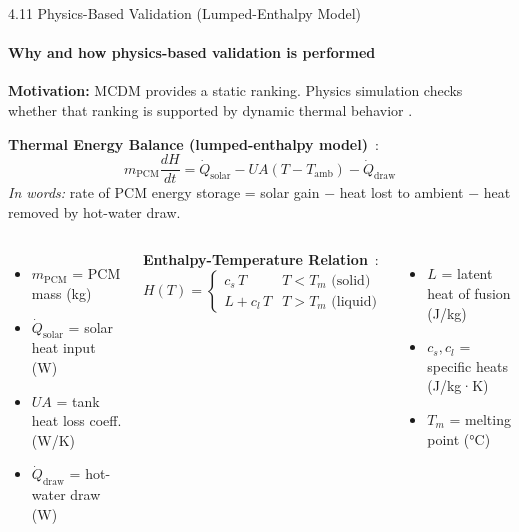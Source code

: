 \documentclass[aspectratio=169, 11pt]{beamer}
\begin{document}
\begin{frame}{4.11 Physics-Based Validation (Lumped-Enthalpy Model)}
\framesubtitle{Why and how physics-based validation is performed}

\footnotesize
\textbf{Motivation:} MCDM provides a static ranking. Physics simulation
checks whether that ranking is supported by dynamic thermal behavior \cite{Barqawi2025PCMSim, Abdellatif2025PCM_Modeling}.

\vspace{0.15cm}
\textbf{Thermal Energy Balance (lumped-enthalpy model)}~\cite{Barqawi2025PCMSim, MADADIAVARGANI2021101350}:
\[
m_{\mathrm{PCM}}\frac{dH}{dt} = \dot{Q}_{\mathrm{solar}} - UA(T-T_{\mathrm{amb}}) - \dot{Q}_{\mathrm{draw}}
\]
\textit{In words:} rate of PCM energy storage = solar gain
$-$ heat lost to ambient $-$ heat removed by hot-water draw.

\vspace{0.1cm}
\begin{columns}[T]
    \footnotesize
    \begin{itemize}
        \setlength{\itemsep}{0pt}
        \item $m_{\mathrm{PCM}}$ = PCM mass (kg)
        \item $\dot{Q}_{\mathrm{solar}}$ = solar heat input (W)
        \item $UA$ = tank heat loss coeff. (W/K)
        \item $\dot{Q}_{\mathrm{draw}}$ = hot-water draw (W)
    \end{itemize}

    \small
    \textbf{Enthalpy-Temperature Relation}~\cite{Abdellatif2025PCM_Modeling}:
    \footnotesize
    \[
    H(T) = \begin{cases}
    c_{s}\,T & T < T_{m} \text{ (solid)} \\
    L + c_{l}\,T & T > T_{m} \text{ (liquid)}
    \end{cases}
    \]
    \begin{itemize}
        \setlength{\itemsep}{0pt}
        \item $L$ = latent heat of fusion (J/kg)
        \item $c_s, c_l$ = specific heats (J/kg·K)
        \item $T_m$ = melting point (°C)
    \end{itemize}
\end{columns}
\end{frame}
\end{document}
